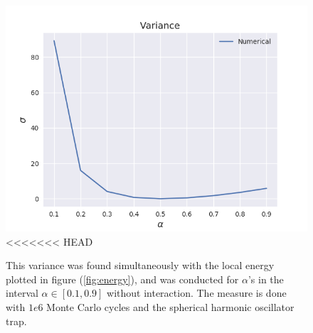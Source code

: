 \documentclass[norsk,a4paper,12pt]{article}
\begin{document}
\begin{figure} [H]
    \centering
    \includegraphics[scale=0.65]{images/variance.png}
<<<<<<< HEAD
    \caption{This variance was found simultaneously with the local energy plotted in figure (\ref{fig:energy}), and was conducted for $\alpha$'s in the interval $\alpha\in[0.1,0.9]$ without interaction. The measure is done with $1e6$ Monte Carlo cycles and the spherical harmonic oscillator trap. }
    \label{fig:variance}
\end{figure} 
\end{document}
